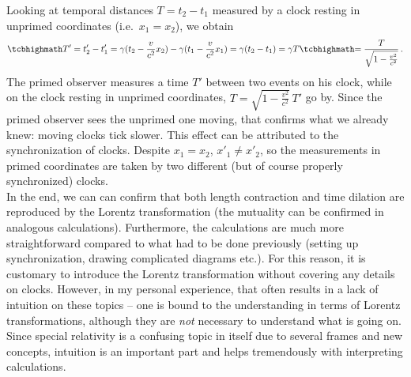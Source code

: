 
Looking at temporal distances $T = t_2 - t_1$ measured by a clock resting in unprimed coordinates (i.e.~$x_1 = x_2$), we obtain
\begin{equation}
	\eqbox{T'} = t'_2 - t'_1 = \gamma (t_2 - \frac{v}{c^2} x_2) - \gamma (t_1 - \frac{v}{c^2} x_1) = \gamma (t_2 - t_1) = \gamma T \eqbox{= \frac{T}{\sqrt{1 - \frac{v^2}{c^2}}}} \, .
\end{equation}
The primed observer measures a time $T'$ between two events on his clock, while on the clock resting in unprimed coordinates, $T = \sqrt{1 - \frac{v^2}{c^2}} \, T'$ go by. Since the primed observer sees the unprimed one moving, that confirms what we already knew: moving clocks tick slower. This effect can be attributed to the synchronization of clocks. Despite $x_1 = x_2$, $x'_1 \neq x'_2$, so the measurements in primed coordinates are taken by two different (but of course properly synchronized) clocks.\\


In the end, we can can confirm that both length contraction and time dilation are reproduced by the Lorentz transformation (the mutuality can be confirmed in analogous calculations). Furthermore, the calculations are much more straightforward compared to what had to be done previously (setting up synchronization, drawing complicated diagrams etc.). For this reason, it is customary to introduce the Lorentz transformation without covering any details on clocks. However, in my personal experience, that often results in a lack of intuition on these topics -- one is bound to the understanding in terms of Lorentz transformations, although they are \emph{not} necessary to understand what is going on. Since special relativity is a confusing topic in itself due to several frames and new concepts, intuition is an important part and helps tremendously with interpreting calculations.



